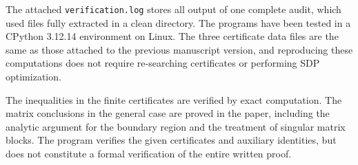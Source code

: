 \documentclass[aps,pra,onecolumn,notitlepage,10pt,amsmath,amssymb,nofootinbib]{revtex4-1}
\begin{document}
The attached \texttt{verification.log} stores all output of one complete audit, which used files fully extracted in a clean directory. The programs have been tested in a CPython 3.12.14 environment on Linux. The three certificate data files are the same as those attached to the previous manuscript version, and reproducing these computations does not require re-searching certificates or performing SDP optimization.

The inequalities in the finite certificates are verified by exact computation. The matrix conclusions in the general case are proved in the paper, including the analytic argument for the boundary region and the treatment of singular matrix blocks. The program verifies the given certificates and auxiliary identities, but does not constitute a formal verification of the entire written proof.
\end{document}
